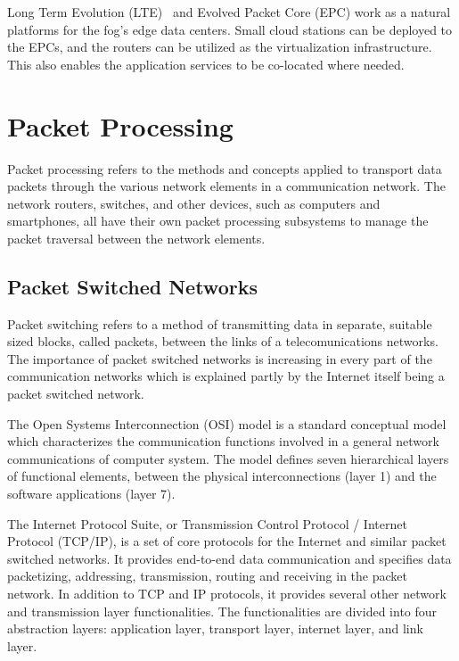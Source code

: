Long Term Evolution (LTE)~\cite{Sesia:2009:LTE} and Evolved Packet Core (EPC) work as a natural platforms for the fog's edge data centers. Small cloud stations can be deployed to the EPCs, and the routers can be utilized as the virtualization infrastructure. This also enables the application services to be co-located where needed.~\cite{Vaquero:2014:FYW}

\section{Packet Processing}
\label{sec:packet-processing}

Packet processing refers to the methods and concepts applied to transport data packets through the various network elements in a communication network. The network routers, switches, and other devices, such as computers and smartphones, all have their own packet processing subsystems to manage the packet traversal between the network elements.  

\subsection{Packet Switched Networks}
Packet switching refers to a method of transmitting data in separate, suitable sized blocks, called packets, between the links of a telecomunications networks. The importance of packet switched networks is increasing in every part of the communication networks which is explained partly by the Internet itself being a packet switched network.

The Open Systems Interconnection (OSI) model is a standard conceptual model which characterizes the communication functions involved in a general network communications of computer system. The model defines seven hierarchical layers of functional elements, between the physical interconnections (layer 1) and the software applications (layer 7).~\cite{ISO:1994:OSI}

The Internet Protocol Suite, or Transmission Control Protocol / Internet Protocol (TCP/IP), is a set of core protocols for the Internet and similar packet switched networks. It provides end-to-end data communication and specifies data packetizing, addressing, transmission, routing and receiving in the packet network. In addition to TCP and IP protocols, it provides several other network and transmission layer functionalities. The functionalities are divided into four abstraction layers: application layer, transport layer, internet layer, and link layer.

